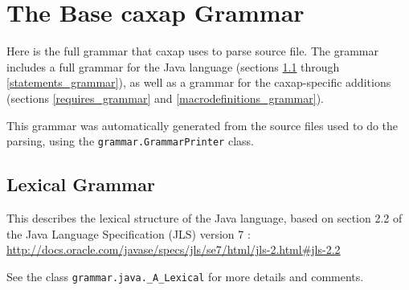 \chapter{The Base caxap Grammar}
\label{grammar}

Here is the full grammar that caxap uses to parse source file. The grammar
includes a full grammar for the Java language (sections \ref{lexical_grammar}
through \ref{statements_grammar}), as well as a grammar for the caxap-specific
additions (sections \ref{requires_grammar} and \ref{macrodefinitions_grammar}).

This grammar was automatically generated from the source files used to do the
parsing, using the \texttt{grammar.GrammarPrinter} class.

\section{Lexical Grammar}
\label{lexical_grammar}

This describes the lexical structure of the Java language, based on section 2.2
of the Java Language Specification (JLS) version 7 :
\url{http://docs.oracle.com/javase/specs/jls/se7/html/jls-2.html#jls-2.2}

See the class \texttt{grammar.java._A_Lexical} for more details and comments.

\hrulefill

